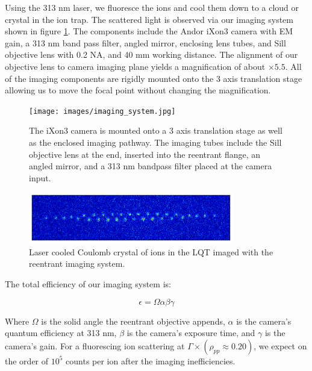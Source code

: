 Using the 313 nm laser, we fluoresce the  ions and cool them down to a cloud or crystal in the ion trap. The scattered light is observed via our imaging system shown in figure \ref{fig: imaging system}. The components include the Andor iXon3 camera with EM gain, a 313 nm band pass filter, angled mirror, enclosing lens tubes, and Sill objective lens with 0.2 NA, and 40 mm working distance. The alignment of our objective lens to camera imaging plane yields a magnification of about $\times5.5$. All of the imaging components are rigidly mounted onto the 3 axis translation stage allowing us to move the focal point without changing the magnification.

\begin{figure}[H]
	\centering
	\texttt{[image: images/imaging\_system.jpg]}
	\caption{The iXon3 camera is mounted onto a 3 axis translation stage as well as the enclosed imaging pathway. The imaging tubes include the Sill objective lens at the end, inserted into the reentrant flange, an angled mirror, and a 313 nm bandpass filter placed at the camera input.}
	\label{fig: imaging system}
\end{figure}

\begin{figure}[H]
	\centering
	\includegraphics[width=0.8\textwidth]{images/ion_crystal_blue.png}
	\caption{Laser cooled Coulomb crystal of  ions in the LQT imaged with the reentrant imaging system.}
	\label{fig: ion crystal}
\end{figure}

The total efficiency of our imaging system is:

\begin{equation}
	\epsilon = \Omega \alpha \beta \gamma
	\label{eq: fluorescence efficiency}
\end{equation}

Where $\Omega$ is the solid angle the reentrant objective appends, $\alpha$ is the camera's quantum efficiency at 313 nm, $\beta$ is the camera's exposure time, and $\gamma$ is the camera's gain. For a fluorescing ion scattering at $\Gamma \times (\rho_{pp} \approx 0.20)$, we expect on the order of $10^5$ counts per ion after the imaging inefficiencies.